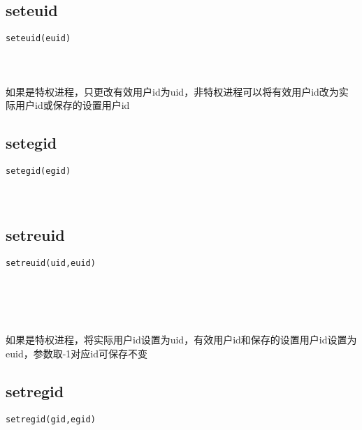 \documentclass[10pt,a4paper]{article}
\begin{document}
\subsection{seteuid}
\begin{spacing}{2.0}
\lstset{language=C,numbers=none}
\begin{lstlisting}
seteuid(euid)
\end{lstlisting}
{\large\color[rgb]{0.2,0.4,0.6}{euid:}}
\paragraph{ \ \ }如果是特权进程，只更改有效用户id为uid，非特权进程可以将有效用户id改为实际用户id或保存的设置用户id
\end{spacing}

\subsection{setegid}
\begin{spacing}{2.0}
\lstset{language=C,numbers=none}
\begin{lstlisting}
setegid(egid)
\end{lstlisting}
{\large\color[rgb]{0.2,0.4,0.6}{egid:}}
\paragraph{ \ \ }
\end{spacing}

\subsection{setreuid}
\begin{spacing}{2.0}
\lstset{language=C,numbers=none}
\begin{lstlisting}
setreuid(uid,euid)
\end{lstlisting}
{\large\color[rgb]{0.2,0.4,0.6}{uid:}} \\
{\large\color[rgb]{0.2,0.4,0.6}{euid:}}
\paragraph{ \ \ }如果是特权进程，将实际用户id设置为uid，有效用户id和保存的设置用户id设置为euid，参数取-1对应id可保存不变
\end{spacing}

\subsection{setregid}
\begin{spacing}{2.0}
\lstset{language=C,numbers=none}
\begin{lstlisting}
setregid(gid,egid)
\end{lstlisting}
{\large\color[rgb]{0.2,0.4,0.6}{gid:}} \\
{\large\color[rgb]{0.2,0.4,0.6}{egid:}}
\paragraph{ \ \ }
\end{spacing}
\end{document}
